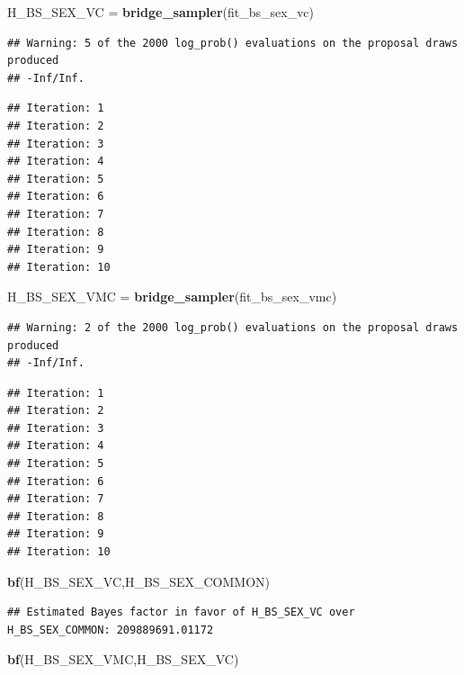 \documentclass[
]{article}
\newenvironment{Shaded}{\begin{snugshade}}{\end{snugshade}}
\newcommand{\KeywordTok}[1]{\textcolor[rgb]{0.13,0.29,0.53}{\textbf{#1}}}
\newcommand{\NormalTok}[1]{#1}
\newcommand{\StringTok}[1]{\textcolor[rgb]{0.31,0.60,0.02}{#1}}
\begin{document}
\begin{Shaded}
\begin{Highlighting}[]
\NormalTok{H_BS_SEX_VC =}\StringTok{ }\KeywordTok{bridge_sampler}\NormalTok{(fit_bs_sex_vc)}
\end{Highlighting}
\end{Shaded}

\begin{verbatim}
## Warning: 5 of the 2000 log_prob() evaluations on the proposal draws produced
## -Inf/Inf.
\end{verbatim}

\begin{verbatim}
## Iteration: 1
## Iteration: 2
## Iteration: 3
## Iteration: 4
## Iteration: 5
## Iteration: 6
## Iteration: 7
## Iteration: 8
## Iteration: 9
## Iteration: 10
\end{verbatim}

\begin{Shaded}
\begin{Highlighting}[]
\NormalTok{H_BS_SEX_VMC =}\StringTok{ }\KeywordTok{bridge_sampler}\NormalTok{(fit_bs_sex_vmc)}
\end{Highlighting}
\end{Shaded}

\begin{verbatim}
## Warning: 2 of the 2000 log_prob() evaluations on the proposal draws produced
## -Inf/Inf.
\end{verbatim}

\begin{verbatim}
## Iteration: 1
## Iteration: 2
## Iteration: 3
## Iteration: 4
## Iteration: 5
## Iteration: 6
## Iteration: 7
## Iteration: 8
## Iteration: 9
## Iteration: 10
\end{verbatim}

\begin{Shaded}
\begin{Highlighting}[]
\KeywordTok{bf}\NormalTok{(H_BS_SEX_VC,H_BS_SEX_COMMON)}
\end{Highlighting}
\end{Shaded}

\begin{verbatim}
## Estimated Bayes factor in favor of H_BS_SEX_VC over H_BS_SEX_COMMON: 209889691.01172
\end{verbatim}

\begin{Shaded}
\begin{Highlighting}[]
\KeywordTok{bf}\NormalTok{(H_BS_SEX_VMC,H_BS_SEX_VC)}
\end{Highlighting}
\end{Shaded}
\end{document}
